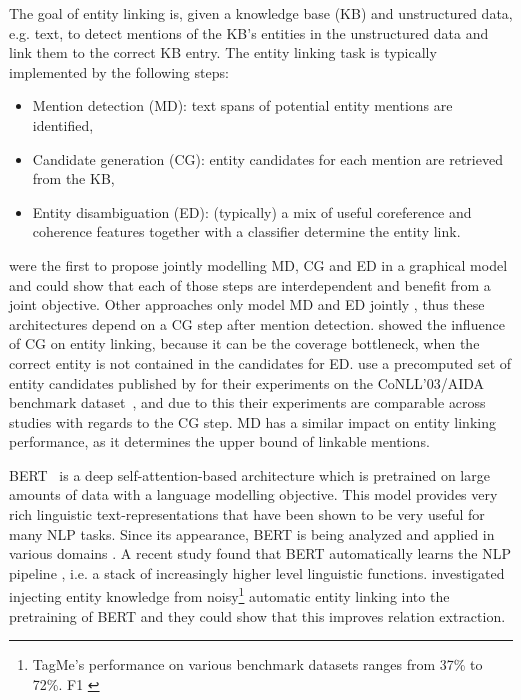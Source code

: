 \documentclass[11pt,a4paper]{article}
\begin{document}
The goal of entity linking is, given a knowledge base (KB) and unstructured data, e.g. text, to detect mentions of the KB's entities in the unstructured data and link them to the correct KB entry. The entity linking task is typically implemented by the following steps: 
\begin{itemize}
    \item Mention detection (MD): text spans of potential entity mentions are identified,
    \item Candidate generation (CG): entity candidates for each mention are retrieved from the KB, 
    \item Entity disambiguation (ED): (typically) a mix of useful coreference and coherence features together with a classifier determine the entity link.
\end{itemize}
\citet{DBLP:journals/tacl/DurrettK14/JointEntity} were the first to propose jointly modelling MD, CG and ED in a graphical model and could show that each of those steps are interdependent and benefit from a joint objective. Other approaches only model MD and ED jointly \citep{DBLP:journals/tacl/NguyenTW16/JNERD, kolitsas-etal-2018-end/Ganea}, thus these architectures depend on a CG step after mention detection. \citet{Hachey:2013:EEL:2405838.2405914/CandGen, DBLP:conf/nldb/GuoQLLL13/CandGen, DBLP:journals/tacl/DurrettK14/JointEntity} showed the influence of CG on entity linking, because it can be the coverage bottleneck, when the correct entity is not contained in the candidates for ED. \citet{DBLP:conf/conll/YamadaS0T16, DBLP:journals/tacl/YamadaSTT17} use a precomputed set of entity candidates published by \citet{DBLP:conf/naacl/PershinaHG15} for their experiments on the CoNLL’03/AIDA benchmark dataset~\citep{DBLP:conf/emnlp/HoffartYBFPSTTW11/AIDA}, and due to this their experiments are comparable across studies with regards to the CG step. MD has a similar impact on entity linking performance, as it determines the upper bound of linkable mentions. 

BERT~\citep{DBLP:conf/naacl/DevlinCLT19} is a deep self-attention-based architecture which is pretrained on large amounts of data with a language modelling objective. This model provides very rich linguistic text-representations that have been shown to be very useful for many NLP tasks. Since its appearance, BERT is being analyzed and applied in various domains \citep{DBLP:journals/corr/abs-1903-10676/scibert, DBLP:journals/corr/abs-1901-08746/biobert}. A recent study found that BERT automatically learns the NLP pipeline \citep{DBLP:conf/acl/TenneyDP19}, i.e. a stack of increasingly higher level linguistic functions.
\citet{DBLP:journals/corr/abs-1905-07129/ernie} investigated injecting entity knowledge from noisy\footnote{TagMe's performance on various benchmark datasets ranges from 37\% to 72\%. F1 \citep{kolitsas-etal-2018-end/Ganea}} automatic entity linking into the pretraining of BERT and they could show that this improves relation extraction. 
\end{document}
